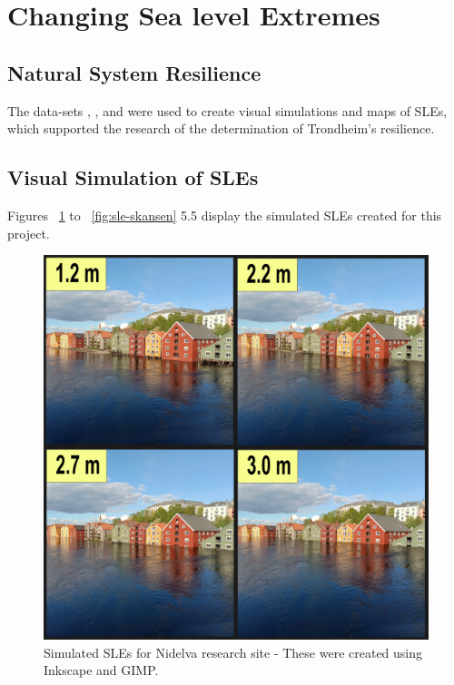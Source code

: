 \section{Changing Sea level Extremes}




\subsection{ Natural System Resilience}

The data-sets  \cite{geonorge_stormflo_nodate} , \cite{kartverket_se_2021}, \cite{stormflo_database_stormflo_2021} and \cite{ipcc_sea_2021} were used to create visual simulations and maps of SLEs, which supported the research of the determination of Trondheim's resilience. 

\subsection{Visual Simulation of SLEs}
 Figures ~\ref{fig:SLE-nidelva} to ~\ref{fig:sle-skansen} 5.5 display the simulated SLEs created for this project. 

\begin{figure}[H]
    \centering
    \includegraphics[width=16cm]{fig_sle/nidelva 2090 q.png}
    \caption{Simulated SLEs for Nidelva research site - These were created using Inkscape and GIMP. }
    \label{fig:SLE-nidelva}
\end{figure}

